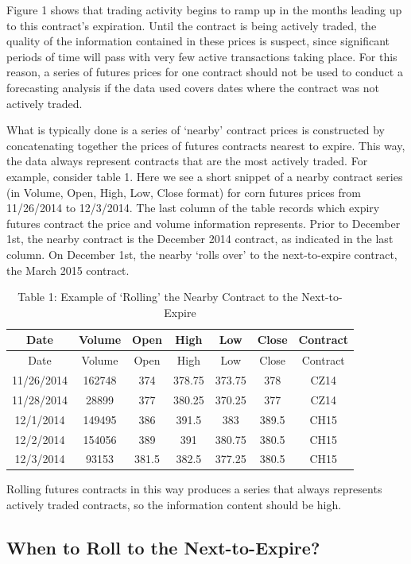 \documentclass[
]{book}
\begin{document}
Figure 1 shows that trading activity begins to ramp up in the months leading up to this contract's expiration. Until the contract is being actively traded, the quality of the information contained in these prices is suspect, since significant periods of time will pass with very few active transactions taking place. For this reason, a series of futures prices for one contract should not be used to conduct a forecasting analysis if the data used covers dates where the contract was not actively traded.

What is typically done is a series of `nearby' contract prices is constructed by concatenating together the prices of futures contracts nearest to expire. This way, the data always represent contracts that are the most actively traded. For example, consider table 1. Here we see a short snippet of a nearby contract series (in Volume, Open, High, Low, Close format) for corn futures prices from 11/26/2014 to 12/3/2014. The last column of the table records which expiry futures contract the price and volume information represents. Prior to December 1st, the nearby contract is the December 2014 contract, as indicated in the last column. On December 1st, the nearby `rolls over' to the next-to-expire contract, the March 2015 contract.

\begin{longtable}[]{@{}ccccccc@{}}
\caption{Table 1: Example of `Rolling' the Nearby Contract to the Next-to-Expire}\tabularnewline
\toprule()
Date & Volume & Open & High & Low & Close & Contract \\
\midrule()
\endfirsthead
\toprule()
Date & Volume & Open & High & Low & Close & Contract \\
\midrule()
\endhead
11/26/2014 & 162748 & 374 & 378.75 & 373.75 & 378 & CZ14 \\
11/28/2014 & 28899 & 377 & 380.25 & 370.25 & 377 & CZ14 \\
12/1/2014 & 149495 & 386 & 391.5 & 383 & 389.5 & CH15 \\
12/2/2014 & 154056 & 389 & 391 & 380.75 & 380.5 & CH15 \\
12/3/2014 & 93153 & 381.5 & 382.5 & 377.25 & 380.5 & CH15 \\
\bottomrule()
\end{longtable}

Rolling futures contracts in this way produces a series that always represents actively traded contracts, so the information content should be high.

\hypertarget{when-to-roll-to-the-next-to-expire}{%
\subsection{When to Roll to the Next-to-Expire?}\label{when-to-roll-to-the-next-to-expire}}
\end{document}
